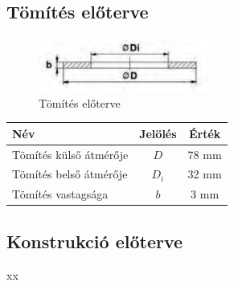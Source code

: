 \documentclass[10pt, a4paper]{article}
\begin{document}
	\subsection{Tömítés előterve}
	\begin{figure}[h]
			\centering
			\includegraphics[width=0.5\textwidth]{ tomites_eloterv.png }
			\caption{Tömítés előterve}
			\label{fig:tomites}
		\end{figure}
	\renewcommand{\arraystretch}{1.4}
	\begin{table}[!h]
		\centering
		\begin{tabular}{l|c|c}
				\textbf{Név}                              & \textbf{Jelölés} & \textbf{Érték} \\ \hline
				Tömítés külső átmérője                     & $D$             & 78 mm           \\
				Tömítés belső átmérője                     & $D_i$           & 32 mm			\\
				Tömítés vastagsága                         & $b$             & 3 mm             
		\end{tabular}
	\end{table}
	\renewcommand{\arraystretch}{1}	
	\subsection{Konstrukció előterve}
	xx
	\newpage
\end{document}
